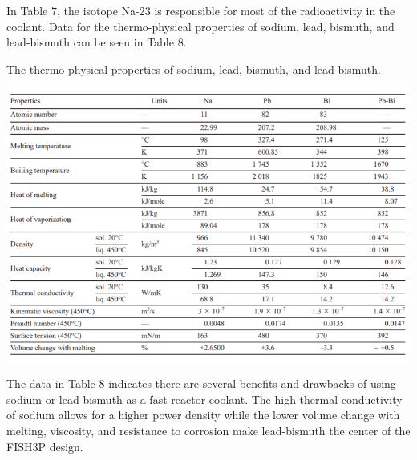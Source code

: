 \documentclass[12pt]{article}
\begin{document}
\begin{enumerate}
In Table 7, the isotope Na-23 is responsible for most of the radioactivity in the coolant.  Data for the thermo-physical properties of sodium, lead, bismuth, and lead-bismuth can be seen in Table 8.

\begin{table}[H]
\begin{center}
 \caption{The thermo-physical properties of sodium, lead, bismuth, and lead-bismuth.} \cite{LBE_properties}
 \label{t:lb-decay}  %
 \includegraphics[width=\textwidth]{thermo-props-FR} %
\end{center}
\end{table}


  The data in Table 8 indicates there are several benefits and drawbacks of using sodium or lead-bismuth as a fast reactor coolant.  The high thermal conductivity of sodium allows for a higher power density while the lower volume change with melting, viscosity, and resistance to corrosion make lead-bismuth the center of the FISH3P design.


\end{enumerate}
\end{document}
